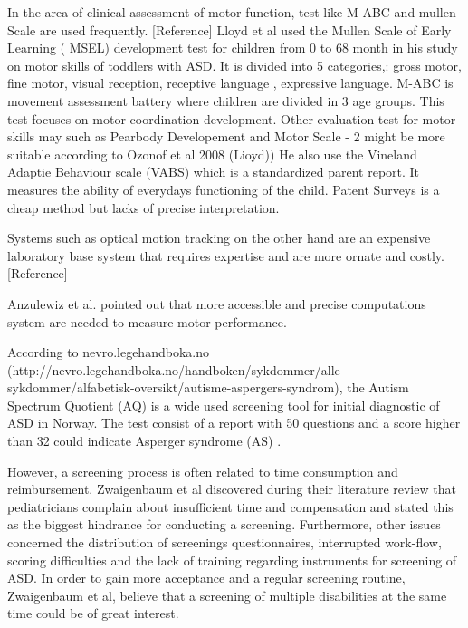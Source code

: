 In the area of clinical assessment of motor function, test like M-ABC and mullen Scale are used frequently. [Reference]
Lloyd et al used the Mullen Scale of Early Learning ( MSEL) development test for children from 0 to 68 month in his study on motor skills of toddlers with ASD. It is divided into 5 categories,: gross motor, fine motor, visual reception,  receptive language , expressive language.
M-ABC is movement assessment battery where children are divided in 3 age groups. This test focuses on  motor coordination development.  
Other evaluation test for  motor skills may such as  Pearbody Developement and Motor Scale - 2 might be more suitable according to Ozonof et al 2008 (Lioyd))
He also use the Vineland Adaptie Behaviour scale (VABS) which is a standardized parent report. It measures the ability of everydays functioning of the child. Patent Surveys is a cheap method but lacks of precise interpretation.

Systems such as optical motion tracking on the other hand  are an expensive laboratory base system that requires expertise and are more ornate and costly. [Reference]

Anzulewiz et al. pointed out that more accessible and precise computations  system are needed to measure motor performance.


According to nevro.legehandboka.no (http://nevro.legehandboka.no/handboken/sykdommer/alle-sykdommer/alfabetisk-oversikt/autisme-aspergers-syndrom), the Autism Spectrum Quotient (AQ) is a wide used screening tool for initial diagnostic of ASD in Norway. The test consist of a report with 50 questions and a score higher than 32 could indicate Asperger syndrome (AS) .

However, a screening process is often related to time consumption and reimbursement. Zwaigenbaum et al discovered during their literature review that pediatricians complain about insufficient time and compensation and stated this as the biggest hindrance for conducting a screening. Furthermore, other issues concerned the distribution of screenings questionnaires, interrupted work-flow, scoring difficulties and the lack of training regarding instruments for  screening of ASD. In order to gain more acceptance and a regular screening routine, Zwaigenbaum et al, believe that a  screening of multiple disabilities at the same time could be of great interest.



